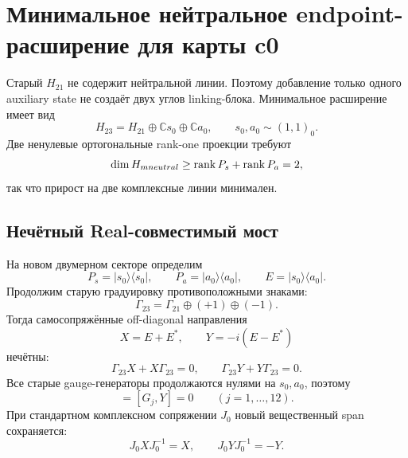 \chapter{Минимальное нейтральное endpoint-расширение для карты c0}
\label{ch:v8-baryon-c0-minimal-neutral-endpoint-extension-gate}

Старый $H_{21}$ не содержит нейтральной линии. Поэтому добавление только
одного auxiliary state не создаёт двух углов linking-блока. Минимальное
расширение имеет вид
\begin{equation}
 H_{23}=H_{21}\oplus\mathbb C s_0\oplus\mathbb C a_0,
 \qquad s_0,a_0\sim(1,1)_0.
 \label{eq:v8-baryon-c0-minimal-neutral-h23}
\end{equation}
Две ненулевые ортогональные rank-one проекции требуют
\begin{equation}
 \dim H_{
m neutral}\ge
 \operatorname{rank} P_s+\operatorname{rank} P_a=2,
 \label{eq:v8-baryon-c0-two-neutral-lines-minimality}
\end{equation}
так что прирост на две комплексные линии минимален.

\section{Нечётный Real-совместимый мост}

На новом двумерном секторе определим
\begin{equation}
 P_s=|s_0\rangle\langle s_0|,
 \qquad P_a=|a_0\rangle\langle a_0|,
 \qquad E=|s_0\rangle\langle a_0|.
 \label{eq:v8-baryon-c0-neutral-extension-matrix-unit}
\end{equation}
Продолжим старую градуировку противоположными знаками:
\begin{equation}
 \Gamma_{23}=\Gamma_{21}\oplus(+1)\oplus(-1).
 \label{eq:v8-baryon-c0-neutral-extension-grading}
\end{equation}
Тогда самосопряжённые off-diagonal направления
\begin{equation}
 X=E+E^*,
 \qquad Y=-i(E-E^*)
 \label{eq:v8-baryon-c0-neutral-bridge-hermitian-pair}
\end{equation}
нечётны:
\begin{equation}
 \Gamma_{23}X+X\Gamma_{23}=0,
 \qquad
 \Gamma_{23}Y+Y\Gamma_{23}=0.
 \label{eq:v8-baryon-c0-neutral-bridge-oddness}
\end{equation}
Все старые gauge-генераторы продолжаются нулями на $s_0,a_0$, поэтому
\begin{equation}
 [G_j,X]=[G_j,Y]=0
 \qquad(j=1,\ldots,12).
 \label{eq:v8-baryon-c0-neutral-bridge-gauge-singlet}
\end{equation}
При стандартном комплексном сопряжении $J_0$ новый вещественный span
сохраняется:
\begin{equation}
 J_0XJ_0^{-1}=X,
 \qquad
 J_0YJ_0^{-1}=-Y.
 \label{eq:v8-baryon-c0-neutral-bridge-real-closure}
\end{equation}

